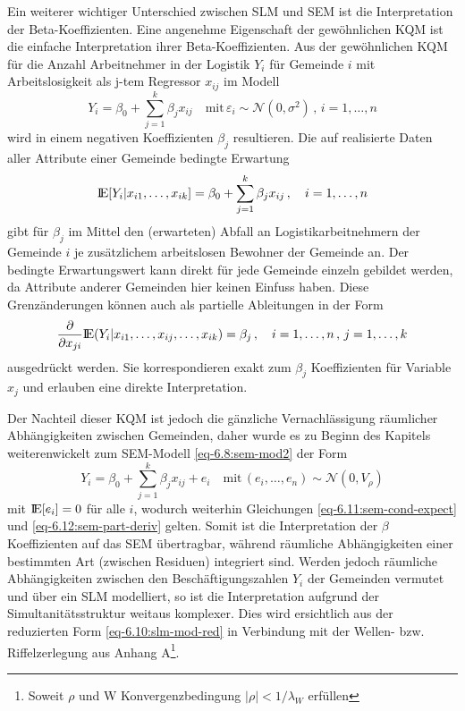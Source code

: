Ein weiterer wichtiger Unterschied zwischen SLM und SEM ist die Interpretation der Beta-Koeffizienten. 
Eine angenehme Eigenschaft der gewöhnlichen KQM ist die einfache Interpretation ihrer Beta-Koeffizienten.
Aus der gewöhnlichen KQM für die Anzahl Arbeitnehmer in der Logistik $Y_{i}$ für Gemeinde $i$ mit 
Arbeitslosigkeit als j-tem Regressor $x_{ij}$ im Modell
\begin{equation*}
    Y_{i}=\beta_{0}+\sum_{j=1}^{k} \beta_{j} x_{ij} \quad \text{mit} \, \varepsilon_{i} \sim \mathcal{N}(0,\sigma^{2})\,, \, i=1,\ldots,n
\end{equation*}
wird in einem negativen Koeffizienten $\beta_{j}$ resultieren. Die auf realisierte Daten aller Attribute einer Gemeinde bedingte Erwartung
\begin{equation} \label{eq-6.11:sem-cond-expect}
    {\rm I\!E}[Y_{i}|x_{i1},\ldots,x_{ik}]=\beta_{0}+\sum_{j=1}^{k} \beta_{j} x_{ij} \, , \quad i=1,\ldots,n
\end{equation}
gibt für $\beta_{j}$ im Mittel den (erwarteten) Abfall an Logistikarbeitnehmern der Gemeinde $i$ je 
zusätzlichem arbeitslosen Bewohner der Gemeinde an. Der bedingte Erwartungswert kann direkt für jede Gemeinde einzeln 
gebildet werden, da Attribute anderer Gemeinden hier keinen Einfuss haben.
Diese Grenzänderungen können auch als partielle Ableitungen in der Form
\begin{equation} \label{eq-6.12:sem-part-deriv}
    \frac{\partial}{\partial x_{ji}} {\rm I\!E}(Y_{i}|x_{i1},\ldots,x_{ij},\ldots,x_{ik})=\beta_{j} \, , \quad i=1,\ldots,n \, , \, j=1,\ldots,k
\end{equation}
ausgedrückt werden. Sie korrespondieren exakt zum $\beta_{j}$ Koeffizienten für Variable $x_{j}$ und erlauben eine direkte Interpretation.

Der Nachteil dieser KQM ist jedoch die gänzliche Vernachlässigung räumlicher Abhängigkeiten zwischen Gemeinden, daher wurde es zu Beginn des 
Kapitels weiterenwickelt zum SEM-Modell \eqref{eq-6.8:sem-mod2} der Form
\begin{equation*}
    Y_{i}=\beta_{0}+\sum_{j=1}^{k} \beta_{j} x_{ij} + e_{i} \quad 
    \text{mit} \, (e_{i},\ldots,e_{n}) \sim \mathcal{N}(0,V_{\rho})
\end{equation*}
mit ${\rm I\!E}[e_{i}]=0$ für alle $i$, wodurch weiterhin Gleichungen \eqref{eq-6.11:sem-cond-expect} und \eqref{eq-6.12:sem-part-deriv} gelten. 
Somit ist die Interpretation der $\beta$ Koeffizienten auf das SEM übertragbar, während räumliche Abhängigkeiten einer bestimmten Art (zwischen Residuen) integriert sind. 
Werden jedoch räumliche Abhängigkeiten zwischen den Beschäftigungszahlen $Y_{i}$ 
der Gemeinden vermutet und über ein SLM modelliert, so ist die Interpretation aufgrund der Simultanitätsstruktur 
weitaus komplexer. Dies wird ersichtlich aus der 
reduzierten Form \eqref{eq-6.10:slm-mod-red} in Verbindung mit der Wellen- bzw. Riffelzerlegung aus
Anhang A\footnote[1]{Soweit $\rho$ und W Konvergenzbedingung $ \left| \rho \right| <1/\lambda_{W}$ erfüllen}.

